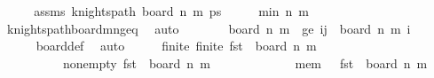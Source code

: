 \begin{isabellebody}
%
\isatagproof
{}\isamarkupfalse%
\ {\isacharminus}{\kern0pt}\isanewline
\ \ \isamarkupfalse%
\ assms{\isacharcolon}{\kern0pt}\ {\isachardoublequoteopen}knights{\isacharunderscore}{\kern0pt}path\ {\isacharparenleft}{\kern0pt}board\ n\ m{\isacharparenright}{\kern0pt}\ ps{\isachardoublequoteclose}\isanewline
\ \ \isamarkupfalse%
\ \isamarkupfalse%
\ {\isachardoublequoteopen}min\ n\ m\ {\isasymge}\ {}{\isachardoublequoteclose}\isanewline
\ \ \ \ \isamarkupfalse%
\ knights{\isacharunderscore}{\kern0pt}path{\isacharunderscore}{\kern0pt}board{\isacharunderscore}{\kern0pt}m{\isacharunderscore}{\kern0pt}n{\isacharunderscore}{\kern0pt}geq{\isacharunderscore}{\kern0pt}{}\ \isamarkupfalse%
\ auto\isanewline
\ \ \isamarkupfalse%
\ \isamarkupfalse%
\ {\isachardoublequoteopen}{\isacharparenleft}{\kern0pt}{}{\isacharcomma}{\kern0pt}{}{\isacharparenright}{\kern0pt}\ {\isasymin}\ board\ n\ m{\isachardoublequoteclose}\ \ ge{\isacharunderscore}{\kern0pt}{}{\isacharcolon}{\kern0pt}\ {\isachardoublequoteopen}{\isasymforall}{\isacharparenleft}{\kern0pt}i{\isacharcomma}{\kern0pt}j{\isacharparenright}{\kern0pt}\ {\isasymin}\ board\ n\ m{\isachardot}{\kern0pt}\ i\ {\isasymge}\ {}{\isachardoublequoteclose}\isanewline
\ \ \ \ \isamarkupfalse%
\ board{\isacharunderscore}{\kern0pt}def\ \isamarkupfalse%
\ auto\isanewline
\ \ \isamarkupfalse%
\ \isamarkupfalse%
\ finite{\isacharcolon}{\kern0pt}\ {\isachardoublequoteopen}finite\ {\isacharparenleft}{\kern0pt}{\isacharparenleft}{\kern0pt}fst{\isacharparenright}{\kern0pt}\ {\isacharbackquote}{\kern0pt}\ board\ n\ m{\isacharparenright}{\kern0pt}{\isachardoublequoteclose}\ \ \isanewline
\ \ \ \ \ \ \ \ \ \ non{\isacharunderscore}{\kern0pt}empty{\isacharcolon}{\kern0pt}\ {\isachardoublequoteopen}{\isacharparenleft}{\kern0pt}fst{\isacharparenright}{\kern0pt}\ {\isacharbackquote}{\kern0pt}\ board\ n\ m\ {\isasymnoteq}\ {\isacharbraceleft}{\kern0pt}{\isacharbraceright}{\kern0pt}{\isachardoublequoteclose}\ \isanewline
\ \ \ \ \ \ \ \ \ \ mem{\isacharunderscore}{\kern0pt}{}{\isacharcolon}{\kern0pt}\ {\isachardoublequoteopen}{}\ {\isasymin}\ {\isacharparenleft}{\kern0pt}fst{\isacharparenright}{\kern0pt}\ {\isacharbackquote}{\kern0pt}\ board\ n\ m{\isachardoublequoteclose}\isanewline
\ \ \ \ \isamarkupfalse%

\end{isabellebody}
